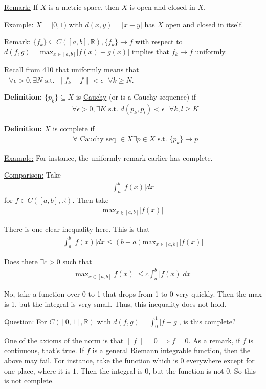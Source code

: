 \documentclass{article}
\newcommand*{\txt}[1]{\text{ #1 }}%
\newcommand*{\fora}{\txt{}\forall}%
\newcommand*{\rr}{\mathbb{R}}%
\begin{document}
\underline{Remark:} If $X$ is a metric space, then $X$ is open and closed in $X$.

\underline{Example:} $X=[0,1)$ with $d(x,y)=|x-y|$ has $X$ open and closed in itself.

\underline{Remark:} $\{f_k\}\subseteq C([a,b],\rr), \{f_k\}\to f$ with respect to $d(f,g)=\text{max}_{x\in[a,b]}|f(x)-g(x)|$ implies that $f_k\to f$ uniformly.

Recall from 410 that uniformly means that $\fora \epsilon>0,\exists N\txt{s.t.}\|f_k-f\|<\epsilon\fora k\geq N$.

\textbf{Definition:} $\{p_k\}\subseteq X$ is \underline{Cauchy} (or is a Cauchy sequence) if \begin{align*}
    \fora \epsilon>0, \exists K\txt{s.t.}d(p_k,p_l)<\epsilon\fora k,l\geq K
\end{align*}

\textbf{Definition:} $X$ is \underline{complete} if \begin{align*}
    \fora \txt{Cauchy seq}\in X\exists p\in X\txt{s.t.}\{p_k\}\to p
\end{align*}

\underline{Example:} For instance, the uniformly remark earlier has complete.

\underline{Comparison:} Take \begin{align*}
    \int_{a}^{b}|f(x)|dx
\end{align*}
for $f\in C([a,b],\rr)$. Then take \begin{align*}
    \text{max}_{x\in[a,b]}|f(x)|
\end{align*}

There is one clear inequality here. This is that \begin{align*}
    \int_{a}^{b}|f(x)|dx\leq (b-a)\text{max}_{x\in[a,b]}|f(x)|
\end{align*}

Does there $\exists c>0$ such that \begin{align*}
    \text{max}_{x\in[a,b]}|f(x)|\leq c\int_{a}^{b}|f(x)|dx
\end{align*}

No, take a function over 0 to 1 that drops from 1 to 0 very quickly. Then the max is 1, but the integral is very small. Thus, this inequality does not hold.

\underline{Question:} For $C([0,1],\rr)$ with $d(f,g)=\int_{0}^{1}|f-g|$, is this complete? 

One of the axioms of the norm is that $\|f\|=0\implies f=0$. As a remark, if $f$ is continuous, that's true. If $f$ is a general Riemann integrable function, then the above may fail. For instance, take the function which is $0$ everywhere except for one place, where it is $1$. Then the integral is 0, but the function is not 0. So this is not complete.
\end{document}
